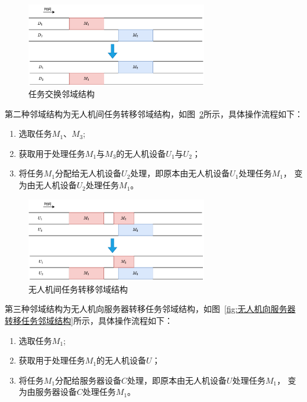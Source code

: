 \begin{figure}[!htbp]
    \centering
    \includegraphics[width=0.7\textwidth]{images/基于边缘计算的任务资源调度算法_任务交换算子.pdf}
    \caption{任务交换邻域结构}
    \label{fig:任务交换邻域结构}
\end{figure}

第二种邻域结构为无人机间任务转移邻域结构，如图~\ref{fig:无人机间任务转移邻域结构}所示，具体操作流程如下：

\begin{enumerate}[label=(\arabic*)]
    \item {选取任务\(M_1\)、\(M_3\);}
    \item {获取用于处理任务\(M_1\)与\(M_3\)的无人机设备\(U_1\)与\(U_2\)；}
    \item {将任务\(M_1\)分配给无人机设备\(U_2\)处理，即原本由无人机设备\(U_1\)处理任务\(M_1\)，
    变为由无人机设备\(U_2\)处理任务\(M_1\)。}
\end{enumerate}

\begin{figure}[!htbp]
    \centering
    \includegraphics[width=0.7\textwidth]{images/基于边缘计算的任务资源调度算法_无人机间任务转移算子.pdf}
    \caption{无人机间任务转移邻域结构}
    \label{fig:无人机间任务转移邻域结构}
\end{figure}

第三种邻域结构为无人机向服务器转移任务邻域结构，如图~\ref{fig:无人机向服务器转移任务邻域结构}所示，具体操作流程如下：

\begin{enumerate}[label=(\arabic*)]
    \item {选取任务\(M_1\);}
    \item {获取用于处理任务\(M_1\)的无人机设备\(U\)；}
    \item {将任务\(M_1\)分配给服务器设备\(C\)处理，即原本由无人机设备\(U\)处理任务\(M_1\)，
    变为由服务器设备\(C\)处理任务\(M_1\)。}
\end{enumerate}

